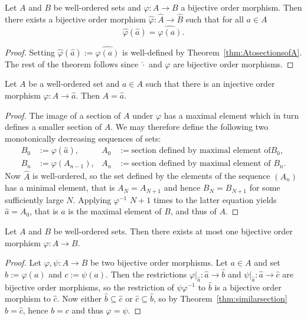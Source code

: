 \documentclass[12pt]{article}
\newcommand{\<}{\langle}
\renewcommand{\>}{\rangle}
\newcommand{\h}{\widehat}
\begin{document}
\begin{thm}
Let $A$ and $B$ be well-ordered sets and $\varphi\colon A\to B$ a
bijective order morphism. Then there exists a bijective order morphism
$\h{\varphi}\colon\h{A}\to\h{B}$ such that for all $a\in A$
\begin{equation*}
\h{\varphi}(\h{a})=\h{\varphi(a)}.
\end{equation*}
\end{thm}
\begin{proof}
Setting $\h{\varphi}(\h{a}):=\h{\varphi(a)}$ is well-defined by
Theorem~\ref{thm:AtosectionsofA}. The rest of the theorem follows
since $\h{\cdot}$ and $\varphi$ are bijective order morphisms.
\end{proof}

\begin{thm}
\label{thm:similarsection}
Let $A$ be a well-ordered set and $a\in A$ such that there is an
injective order morphism $\varphi\colon A\to\h{a}$. Then $A=\h{a}$.
\end{thm}
\begin{proof}
The image of a section of $A$ under $\varphi$ has a maximal element
which in turn defines a smaller section of $A$. We may therefore
define the following two monotonically decreasing sequences of sets:
\begin{align*}
B_0&:=\varphi(\h{a}),&A_0&:=\text{section defined by maximal element of
}B_0,\\
B_n&:=\varphi(A_{n-1}),&A_n&:=\text{section defined by maximal element
of }B_n.
\end{align*}
Now $\h{A}$ is well-ordered, so the set defined by the elements of the
sequence $(A_n)$ has a minimal element, that is $A_N=A_{N+1}$ and
hence $B_N=B_{N+1}$ for some sufficiently large $N$. Applying
$\varphi^{-1}$ $N+1$ times to the latter equation yields $\h{a}=A_0$,
that is $a$ is the maximal element of $B$, and thus of $A$.
\end{proof}

\begin{thm}
\label{thm:uniquemorphism}
Let $A$ and $B$ be well-ordered sets. Then there exists at most one
bijective order morphism $\varphi\colon A\to B$.
\end{thm}
\begin{proof}
Let $\varphi,\psi\colon A\to B$ be two bijective order morphisms. Let
$a\in A$ and set $b:=\varphi(a)$ and $c:=\psi(a)$. Then the
restrictions $\left.\varphi\right|_{\h{a}}\colon\h{a}\to\h{b}$ and
$\left.\psi\right|_{\h{a}}\colon\h{a}\to\h{c}$ are bijective order
morphisms, so the restriction of $\psi\varphi^{-1}$ to $\h{b}$ is a
bijective order morphism to $\h{c}$. Now either $\h{b}\subseteq\h{c}$
or $\h{c}\subseteq\h{b}$, so by Theorem~\ref{thm:similarsection}
$\h{b}=\h{c}$, hence $b=c$ and thus $\varphi=\psi$.
\end{proof}
\end{document}
